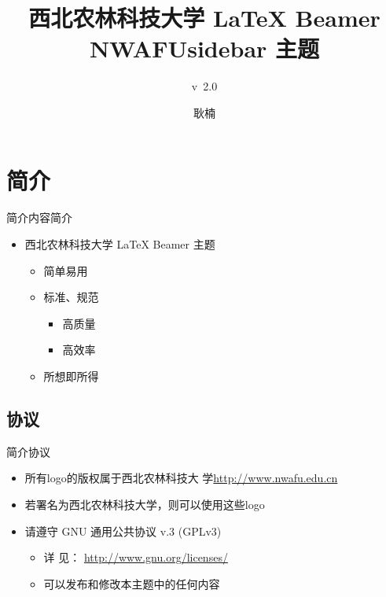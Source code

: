 \documentclass[xcolor=svgnames, t, aspectratio=169]{ctexbeamer}
\title[Beamer 主题] %
{西北农林科技大学 {\LaTeX} Beamer NWAFUsidebar 主题}
\subtitle{v\ 2.0} %
\date{\tosemester} %
\author[N. Geng] %
{耿楠}
\institute[智能媒体实验室] %
{%
  \cie
  
}
\begin{document}
{\nwafuwavesbg%
\begin{frame} %
  \titlepage
\end{frame}
}

\section{简介}
\begin{frame}{简介}{内容简介}
  \begin{itemize}
  \item 西北农林科技大学 {\LaTeX} \alert{Beamer 主题}
    \begin{itemize}
    \item 简单易用
    \item 标准、规范
      \begin{itemize}
      \item 高质量
      \item 高效率
      \end{itemize}
    \item \alert{所想即所得}
    \end{itemize}
  \end{itemize}
\end{frame}

\subsection{协议}
\begin{frame}{简介}{协议}
  \begin{itemize}
  \item 所有logo的版权属于西北农林科技大
    学\href{http://www.nwafu.edu.cn}{http://www.nwafu.edu.cn}
  \item 若署名为西北农林科技大学，则可以使用这些logo
  \item 请遵守 GNU 通用公共协议 v.3 (GPLv3)
    \begin{itemize}
    \item 详
      见：
      \href{http://www.gnu.org/licenses/}{http://www.gnu.org/licenses/}
    \item 可以发布和修改本主题中的任何内容
    \end{itemize}
  \end{itemize}
\end{frame}
\end{document}
